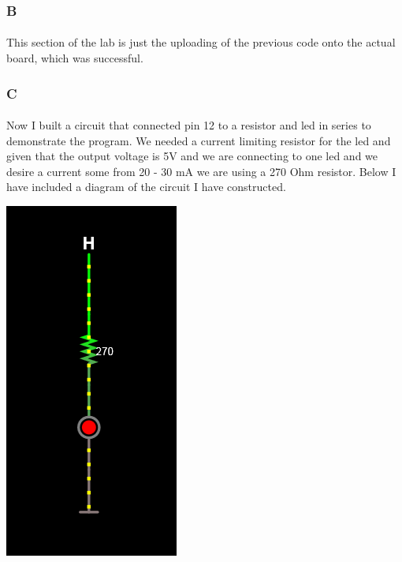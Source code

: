 \documentclass[12pt]{article}
\begin{document}
			\subsubsection{B}
				\paragraph{}
					This section of the lab is just the uploading of the previous code onto the actual board, which was successful.

			\subsubsection{C}
				\paragraph{}
					Now I built a circuit that connected pin 12 to a resistor and led in series to demonstrate the program.  We needed a 
					current limiting resistor for the led and given that the output voltage is 5V and we are connecting to one led and we 
					desire a current some from 20 - 30 mA we are using a 270 Ohm resistor.  Below I have included a diagram of the circuit
					I have constructed.

					\begin{center}
						\includegraphics[scale=0.3]{circuit1.png}\\
					\end{center}
\end{document}
